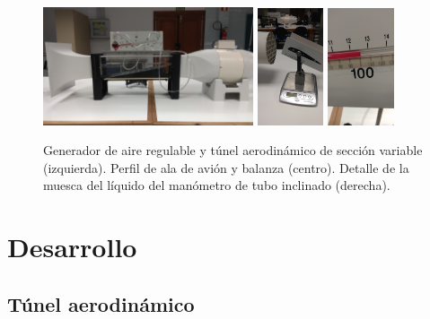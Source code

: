 \documentclass[11pt]{articulo}
\begin{document}
\begin{figure}[htb]
\begin{center}
\hspace*{0.0cm}
\includegraphics[width=0.552\textwidth]{figuras/aerodinamica_Figura_2a.jpg}
\includegraphics[width=0.174\textwidth]{figuras/aerodinamica_Figura_2b.jpg}
\includegraphics[width=0.174\textwidth]{figuras/aerodinamica_Figura_2c.jpg}
\end{center}
\vspace*{-0.6cm}
\caption[]{\label{dispositivo}{Generador de aire regulable y t\'unel aerodin\'amico de secci\'on variable (izquierda). Perfil de ala de avi\'on y balanza (centro). Detalle de la muesca del l\'iquido del man\'ometro de tubo inclinado (derecha).}}
\end{figure}


\section{Desarrollo}

\subsection{T\'unel aerodin\'amico}
\end{document}
